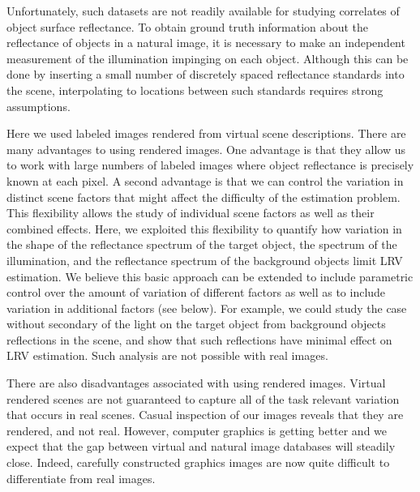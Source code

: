 \documentclass{jov}
\begin{document}
Unfortunately, such datasets are not readily available for studying correlates of object surface reflectance.
To obtain ground truth information about the reflectance of objects in a natural image, it is necessary to make 
an independent measurement of the illumination impinging on each object.
Although this can be done by inserting a small number of discretely spaced reflectance standards into the scene, 
interpolating to locations between such standards requires strong assumptions.

Here we used labeled images rendered from virtual scene descriptions. 
There are many advantages to using rendered images.
One advantage is that they allow us to work with large numbers of labeled images where object reflectance is precisely known at each pixel.
A second advantage is that we can control the variation in distinct scene factors that might affect the difficulty of the estimation problem.
This flexibility allows the study of individual scene factors as well as their combined effects.
Here, we exploited this flexibility to quantify how variation in the shape of the reflectance spectrum of the target object, the spectrum of the illumination, and the reflectance spectrum of the background objects limit LRV estimation.
We believe this basic approach can be extended to include parametric control over the amount of variation of different factors as well as to include variation in additional factors (see below).
For example, we could study the case without secondary of the light on the target object from background objects reflections in the scene, and show that such reflections have minimal effect on LRV estimation.
Such analysis are not possible with real images.

There are also disadvantages associated with using rendered images. 
Virtual rendered scenes are not guaranteed to capture all of the task relevant variation that occurs in real scenes.
Casual inspection of our images reveals that they are rendered, and not real.
However, computer graphics is getting better and we expect that the gap between virtual and natural image databases will steadily close.
Indeed, carefully constructed graphics images are now quite difficult to differentiate from real images.
\end{document}
